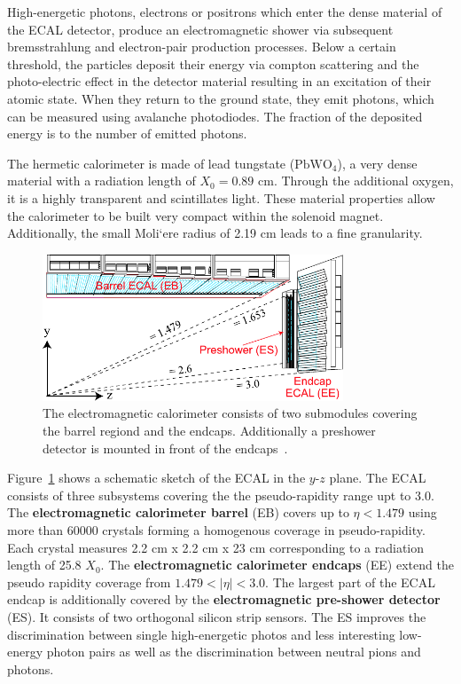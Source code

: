 High-energetic photons, electrons or positrons which enter the dense material of the ECAL
detector, produce an electromagnetic shower via subsequent bremsstrahlung and
electron-pair production processes. Below a certain threshold, the particles
deposit their energy via compton scattering and the photo-electric effect in the
detector material resulting in an excitation of their atomic state. When they
return to the ground state, they emit photons, which can be measured using
avalanche photodiodes. The fraction of the deposited energy is to the number of
emitted photons.

The hermetic calorimeter is made of lead tungstate ($\mathrm{PbWO}_4$), a very
dense material with a radiation length of $X_0 = 0.89$ cm. Through the
additional oxygen, it is a highly transparent and scintillates light. These
material properties allow the calorimeter to be built very compact within the
solenoid magnet. Additionally, the small Moli`ere  radius of 2.19 cm leads to a
fine granularity. 

\begin{figure}[htb]
    \centering
    \includegraphics[width=0.8\textwidth]{figures/cms_detector/cms_ecal.pdf}\hfill
    \caption[Electromagnetic Calorimeter]{The electromagnetic calorimeter
    consists of two submodules covering the barrel regiond and the endcaps.
    Additionally a preshower detector is mounted in front of the
    endcaps~\cite{cms:ecal}.}
    \label{fig:cms:ecal}
\end{figure}

Figure~\ref{fig:cms:ecal} shows a schematic sketch of the ECAL in the $y$-$z$
plane. The ECAL consists of three subsystems covering the the pseudo-rapidity
range upt to 3.0. The \textbf{electromagnetic calorimeter barrel} (EB) covers up
to $\eta < 1.479$ using more than 60000 crystals forming a homogenous coverage
in pseudo-rapidity. Each crystal measures 2.2 cm x 2.2 cm x 23 cm corresponding
to a radiation length of 25.8 $X_0$. The \textbf{electromagnetic calorimeter
endcaps} (EE) extend the pseudo rapidity coverage from $1.479 < |\eta| < 3.0$. The
largest part of the ECAL endcap is additionally covered by the
\textbf{electromagnetic pre-shower detector} (ES). It consists of two
orthogonal silicon strip sensors. The ES improves the discrimination between single
high-energetic photos and less interesting low-energy photon pairs as well as
the discrimination between neutral pions and photons.

